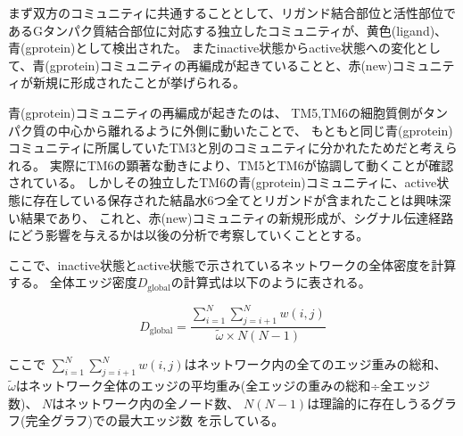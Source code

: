 \newpage

まず双方のコミュニティに共通することとして、リガンド結合部位と活性部位であるGタンパク質結合部位に対応する独立したコミュニティが、黄色(ligand)、青(gprotein)として検出された。
またinactive状態からactive状態への変化として、青(gprotein)コミュニティの再編成が起きていることと、赤(new)コミュニティが新規に形成されたことが挙げられる。

\begin{table}[!ht]
  \centering
  \caption{活性化に伴うコミュニティの再編成と、コミュニティを構成している残基群の比較}
  \label{tab:community_change}
\end{table}

青(gprotein)コミュニティの再編成が起きたのは、
TM5,TM6の細胞質側がタンパク質の中心から離れるように外側に動いたことで、
もともと同じ青(gprotein)コミュニティに所属していたTM3と別のコミュニティに分かれたためだと考えられる。
実際にTM6の顕著な動きにより、TM5とTM6が協調して動くことが確認されている。
しかしその独立したTM6の青(gprotein)コミュニティに、active状態に存在している保存された結晶水6つ全てとリガンドが含まれたことは興味深い結果であり、
これと、赤(new)コミュニティの新規形成が、シグナル伝達経路にどう影響を与えるかは以後の分析で考察していくこととする。

ここで、inactive状態とactive状態で示されているネットワークの全体密度を計算する。
全体エッジ密度$D_{\text{global}}$の計算式は以下のように表される。

\begin{equation}
  D_{\text{global}} = \frac{\sum_{i=1}^{N} \sum_{j=i+1}^{N} w(i, j)}{\tilde{\omega} \times N(N-1)}
\end{equation}

ここで
$\sum_{i=1}^{N} \sum_{j=i+1}^{N} w(i, j)$はネットワーク内の全てのエッジ重みの総和、
$\tilde{\omega}$はネットワーク全体のエッジの平均重み(全エッジの重みの総和÷全エッジ数)、
$N$はネットワーク内の全ノード数、
$N(N-1)$は理論的に存在しうるグラフ(完全グラフ)での最大エッジ数
を示している。

